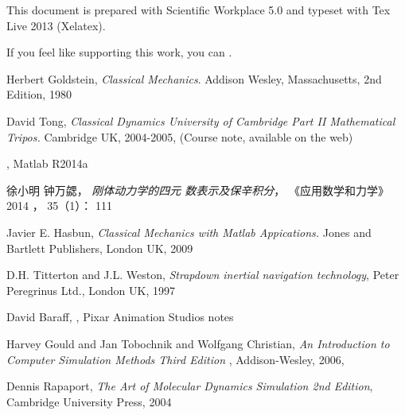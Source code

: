 \documentclass[12pt,twoside]{article}
\begin{document}
\href{https://drive.google.com/file/d/0B96HmLH-SQVmM1dvYlFiQm9ESGM/edit?usp=sharing%
}{\underline{\color{blue}%
%
}}

\href{http://tinypic.com/r/10cw9yf/8}{\underline{\color{blue}%
}}

This document is prepared with Scientific Workplace 5.0 and typeset with Tex
Live 2013 (Xelatex). \href{http://whymranderson.blogspot.tw/2014/03/how-to-convert-swp-50-special-unicode.html%
}{\underline{\color{blue}}}

If you feel like supporting this work, you can \href{https://www.paypal.com/us/cgi-bin/webscr?cmd=_flow&SESSION=WlwN4JPJMnohiYq8N9IuRiEIHqDEyNxauM_sF1u1Qh3M5sQBsssTjYFi4yu&dispatch=5885d80a13c0db1f8e263663d3faee8d5402c249c5a2cfd4a145d37ec05e9a5e%
}{\underline{\color{blue}}}.

\begin{thebibliography}{9}
 Herbert Goldstein, \emph{Classical Mechanics}. Addison
Wesley, Massachusetts, 2nd Edition, 1980

 David Tong, \emph{Classical Dynamics University of Cambridge
Part II Mathematical Tripos.} Cambridge UK, 2004-2005, (Course note,
available on the web)

 \href{http://www.mathworks.com/help/matlab/ordinary-differential-equations.html%
}{\underline{\color{blue}%
}}, Matlab R2014a

 徐小明 钟万勰，%
\textit{刚体动力学的四元%
数表示及保辛积分}，%
《应用数学和力学》 2014%
， 35（1）： 111

 Javier E. Hasbun, \emph{Classical Mechanics with Matlab
Appications.} Jones and Bartlett Publishers, London UK, 2009

 D.H. Titterton and J.L. Weston, \emph{Strapdown inertial
navigation technology}, Peter Peregrinus Ltd., London UK, 1997

 David Baraff\textit{, }\href{http://graphics.cs.cmu.edu/courses/15-869-F08/lec/14/notesg.pdf%
}{\underline{\color{blue}%
}}, Pixar Animation Studios notes

 Harvey Gould and Jan Tobochnik and Wolfgang
Christian, \emph{An Introduction to Computer Simulation Methods Third Edition%
}, Addison-Wesley, 2006, \href{http://www.opensourcephysics.org/items/detail.cfm?ID=7375%
}{\underline{\color{blue}}}

 Dennis Rapaport, \emph{The Art of Molecular Dynamics
Simulation 2nd Edition}, Cambridge University Press, 2004
\end{thebibliography}
\end{document}
